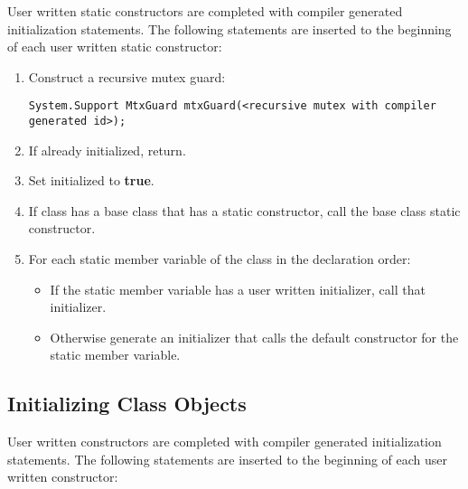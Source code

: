 \documentclass[a4paper,oneside,11pt]{book}
\theoremstyle{definition}
\begin{document}
User written static constructors are completed with compiler generated initialization statements.
The following statements are inserted to the beginning of each user written static constructor:
\begin{enumerate}
\item
Construct a recursive mutex guard:
\lstset{language=Cmajor}
\begin{lstlisting}[frame=trBL]
System.Support MtxGuard mtxGuard(<recursive mutex with compiler generated id>);
\end{lstlisting}
\item
If already initialized, return.
\item
Set initialized to \textbf{true}.
\item
If class has a base class that has a static constructor, call the base class static constructor.
\item
For each static member variable of the class in the declaration order:
\begin{itemize}
\item
If the static member variable has a user written initializer, call that initializer.
\item
Otherwise generate an initializer that calls the default constructor for the static member variable.
\end{itemize}
\end{enumerate}

\subsection{Initializing Class Objects}

User written constructors are completed with compiler generated initialization statements.
The following statements are inserted to the beginning of each user written constructor:
\end{document}

